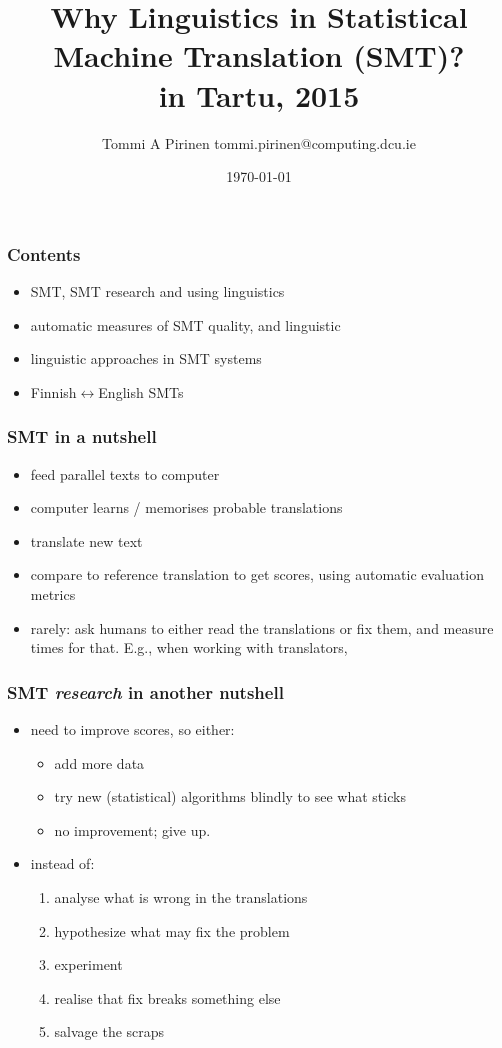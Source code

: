 \documentclass{beamer}
\title{Why Linguistics in Statistical Machine Translation (SMT)?\\
\scriptsize{in Tartu, 2015}}
\author{Tommi A Pirinen \scriptsize \guilsinglleft{}tommi.pirinen@computing.dcu.ie\guilsinglright{}}
\institute{Ollscoil Chathair Bhaile Átha Cliath, ADAPT Centre\\
EU Marie Curie Abu-MaTran project}
\date{\today}
\begin{document}

\maketitle

\begin{frame}
    \frametitle{Contents}
    \begin{itemize}
        \item SMT, SMT research and using linguistics
        \item automatic measures of SMT quality,
            and linguistic
        \item linguistic approaches in SMT systems
        \item Finnish$\leftrightarrow$English SMTs
    \end{itemize}
\end{frame}


\begin{frame}
    \frametitle{SMT in a nutshell}
    \begin{itemize}
        \item feed parallel texts to computer
        \item computer learns / memorises probable translations
        \item translate new text
        \item compare to reference translation to get scores, using automatic
            evaluation metrics
        \item rarely: ask humans to either read the translations or fix them,
            and measure times for that. E.g., when
            working with translators, 
    \end{itemize}
\end{frame}

\begin{frame}
    \frametitle{SMT \emph{research} in another nutshell}
    \begin{itemize}
        \item need to improve scores, so either:
            \begin{itemize}
                \item add more data
                \item try new (statistical) algorithms blindly to see what sticks
                \item no improvement; give up.
            \end{itemize}
        \item instead of:
            \begin{enumerate}
                \item analyse what is wrong in the translations
                \item hypothesize what may fix the problem
                \item experiment
                \item realise that fix breaks something else
                \item salvage the scraps
            \end{enumerate}
    \end{itemize}
\end{frame}
\end{document}
